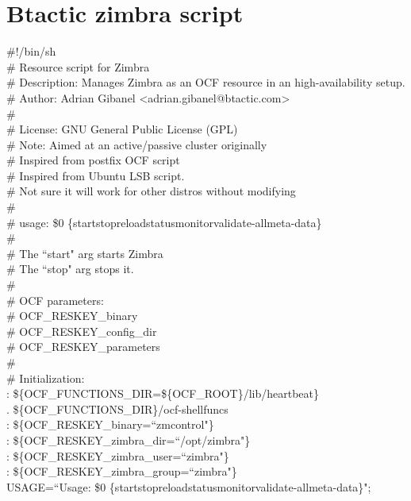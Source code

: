 \documentclass[a4paper, 12pt]{book}
\begin{document}
%
{}



%
\appendix
\chapter{Btactic zimbra script}
\label{app:appendix1}

\#!/bin/sh\\
\# Resource script for Zimbra\\
\# Description:  Manages Zimbra as an OCF resource in an high-availability setup.\\
\# Author: Adrian Gibanel \textless adrian.gibanel@btactic.com\textgreater \\
\#\\
\# License: GNU General Public License (GPL)\\
\# Note:  Aimed at an active/passive cluster originally\\
\#        Inspired from postfix OCF script\\
\#        Inspired from Ubuntu LSB script.\\
\#        Not sure it will work for other distros without modifying\\
\#\\
\#   usage: \$0 \{start\textbar stop\textbar reload\textbar status\textbar monitor\textbar validate-all\textbar meta-data\}\\
\#\\
\#       The ``start" arg starts Zimbra\\
\#       The ``stop" arg stops it.\\
\#\\
\# OCF parameters:\\
\#  OCF\_RESKEY\_binary\\
\#  OCF\_RESKEY\_config\_dir\\
\#  OCF\_RESKEY\_parameters\\
\#\\

\noindent \# Initialization:\\
\noindent : \$\{OCF\_FUNCTIONS\_DIR=\$\{OCF\_ROOT\}/lib/heartbeat\}\\
. \$\{OCF\_FUNCTIONS\_DIR\}/ocf-shellfuncs\\
: \$\{OCF\_RESKEY\_binary=``zmcontrol"\}\\
: \$\{OCF\_RESKEY\_zimbra\_dir=``/opt/zimbra"\}\\
: \$\{OCF\_RESKEY\_zimbra\_user=``zimbra"\}\\
: \$\{OCF\_RESKEY\_zimbra\_group=``zimbra"\}\\
USAGE=``Usage: \$0 \{start\textbar stop\textbar reload\textbar status\textbar monitor\textbar validate-all\textbar meta-data\}";\\
\end{document}

